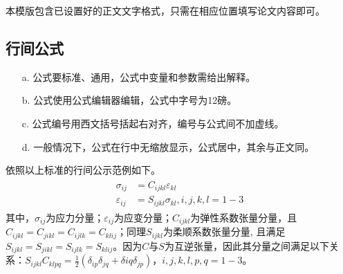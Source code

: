本模版包含已设置好的正文文字格式，只需在相应位置填写论文内容即可。

\subsection{行间公式}
\begin{enumerate}
    \item[a.] 	公式要标准、通用，公式中变量和参数需给出解释。
    \item[b.] 	公式使用公式编辑器编辑，公式中字号为12磅。
    \item[c.] 	公式编号用西文括号括起右对齐，编号与公式间不加虚线。
    \item[d.] 	一般情况下，公式在行中无缩放显示，公式居中，其余与正文同。
\end{enumerate}

依照以上标准的行间公示范例如下。
\begin{equation}
    \begin{aligned}
        \begin{split}
            \sigma_{ij} &= C_{ijkl}\varepsilon_{kl} \\
            \varepsilon_{ij} &= S_{ijkl}\sigma_{kl}, i, j, k, l = 1-3
        \end{split}
    \end{aligned}
\end{equation}
其中，$\sigma_{ij}$为应力分量；$\varepsilon_{ij}$为应变分量；$C_{ijkl}$为弹性系数张量分量，且$C_{ijkl} = C_{jikl} = C_{ijlk} = C_{klij}$；同理$S_{ijkl}$为柔顺系数张量分量, 且满足$S_{ijkl} = S_{jikl} = S_{ijlk} = S_{klij}$。因为$C$与$S$为互逆张量，因此其分量之间满足以下关系：$S_{ijkl}C_{klpq} = \frac{1}{2} (\delta_{ip}\delta_{jq}+\delta{iq}\delta_{jp})，i, j, k, l, p, q = 1-3$。

